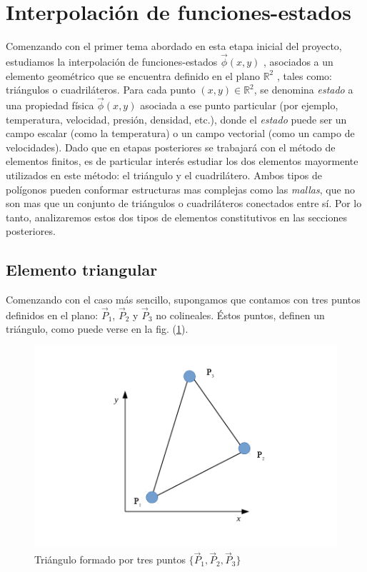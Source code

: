 \section{Interpolación de funciones-estados}
\label{sec:interpestados}

Comenzando con el primer tema abordado en esta etapa inicial del proyecto, estudiamos la interpolación de funciones-estados $\vec{ \phi } (x,y)$ , asociados a un elemento geométrico que se encuentra definido en el plano $\mathbb{R}^2$ , tales como: triángulos o cuadriláteros. Para cada punto $(x,y)\in \mathbb{R}^2$, se denomina \emph{estado} a una propiedad física $\vec{ \phi } (x,y)$ asociada a ese punto particular (por ejemplo, temperatura, velocidad, presión, densidad, etc.), donde el \emph{estado} puede ser un campo escalar (como la temperatura) o un campo vectorial (como un campo de velocidades). Dado que en etapas posteriores se trabajará con el método de elementos finitos, es de particular interés estudiar los dos elementos mayormente utilizados en este método: el triángulo y el cuadrilátero. Ambos tipos de polígonos pueden conformar estructuras mas complejas como las \emph{mallas}, que no son mas que un conjunto de triángulos o cuadriláteros conectados entre sí. Por lo tanto, analizaremos estos dos tipos de elementos constitutivos en las secciones posteriores.

\subsection{Elemento triangular}
\label{sec:triangulos}
Comenzando con el caso más sencillo, supongamos que contamos con tres puntos definidos en el plano: $ \vec{P}_{1} $, $ \vec{P}_{2} $ y $ \vec{P}_{3} $ no colineales. Éstos puntos, definen un triángulo, como puede verse en la fig. (\ref{fig:tri_simple}).

\begin{figure}
\centering
\includegraphics[scale=.8]{triangulo_simple.pdf}
\caption{\label{fig:tri_simple} Triángulo formado por tres puntos $ \lbrace \vec{P}_{1}, \vec{P}_{2}, \vec{P}_{3}  \rbrace $}
\end{figure}

